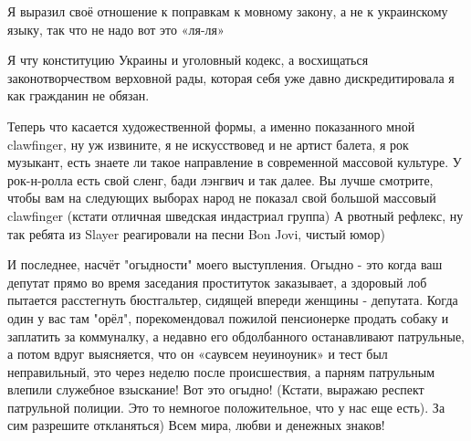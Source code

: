 Я выразил своё отношение к поправкам к мовному закону, а не к украинскому
языку, так что не надо вот это «ля-ля» 

Я чту конституцию Украины и уголовный кодекс, а восхищаться законотворчеством
верховной рады, которая себя уже давно дискредитировала я как гражданин не
обязан. 

Теперь что касается художественной формы, а именно показанного мной clawfinger,
ну уж извините, я не искусствовед и не артист балета, я рок музыкант, есть
знаете ли такое направление в современной массовой культуре. У рок-н-ролла есть
свой сленг, бади лэнгвич и так далее. Вы лучше смотрите, чтобы вам на следующих
выборах народ не показал свой большой массовый clawfinger (кстати отличная
шведская индастриал группа) А рвотный рефлекс, ну так ребята из Slayer
реагировали на песни Bon Jovi, чистый юмор) 

И последнее, насчёт "огыдности" моего выступления. Огыдно - это когда ваш
депутат прямо во время заседания проституток заказывает, а здоровый лоб
пытается расстегнуть бюстгальтер, сидящей впереди женщины - депутата. Когда
один у вас там "орёл", порекомендовал пожилой пенсионерке продать собаку и
заплатить за коммуналку, а недавно его обдолбанного останавливают патрульные,
а потом вдруг выясняется, что он  «саувсем неуиноуник» и тест был
неправильный, это через неделю после происшествия, а парням патрульным влепили
служебное взыскание! Вот это огыдно! (Кстати, выражаю респект патрульной
полиции. Это то немногое положительное, что у нас еще есть). За сим разрешите
откланяться)  Всем мира, любви и денежных знаков!
